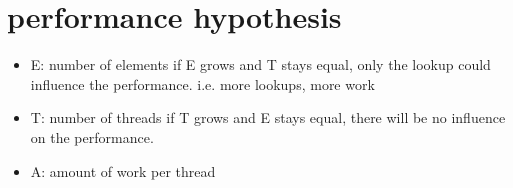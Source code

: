 \documentclass[10pt,a4paper]{article}
\begin{document}
\section{performance hypothesis}
\begin{itemize}
 \item E: number of elements 
    if E grows and T stays equal, only the lookup could influence the performance.
    i.e. more lookups, more work
 \item T: number of threads 
    if T grows and E stays equal, there will be no influence on the performance.
 \item  A: amount of work per thread
\end{itemize}
\end{document}
